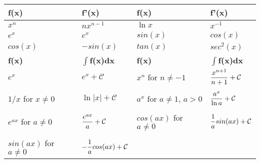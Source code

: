 \begin{center}
  \begin{tabular}{|| l l | l l ||}
    \hline\hline
       {\bf f(x)}  & {\bf f'(x)}  & {\bf f(x)}  & {\bf f'(x)}  \\
    \hline\hline
       $x^{n}$      &  $nx^{n-1}$   & $\ln{x}$    & $x^{-1}$      \\
       $e^{x}$      &  $e^{x}$      & $sin(x)$   & $cos(x)$     \\
       $cos(x)$    &  $-sin(x)$   & $tan(x)$    & $sec^{2}(x)$  \\
    \hline\hline
       {\bf f(x)}  &  {\bf $\int$f(x)dx} & {\bf f(x)}  &  {\bf $\int$f(x)dx} \\
    \hline\hline
       $e^{x}$      & $e^{x}+\mathcal{C}$& $x^{n}$ for $n\neq -1$ & $\displaystyle\frac{x^{n+1}}{n+1}+\mathcal{C}$ \\
                    &                  &                        & \\
       $1/x$ for $x\neq 0$& $\ln{|x|}+\mathcal{C}$ & $a^{x}$ for $a\neq 1$, $a>0$ & $\displaystyle\frac{a^{x}}{\ln{a}}+\mathcal{C}$\\
                   &                  &                         & \\
       $e^{ax}$ for $a\neq 0$  & $\displaystyle\frac{e^{ax}}{a}+\mathcal{C}$ & $cos(ax)$ for $a\neq0$ & $\displaystyle\frac{1}{a}sin(ax)+\mathcal{C}$\\
                   &                  &                        & \\
       $sin(ax)$ for $a\neq 0$ & $-\displaystyle\frac{1}{a}cos(ax)+\mathcal{C}$& & \\
    \hline\hline
  \end{tabular}
\end{center}

